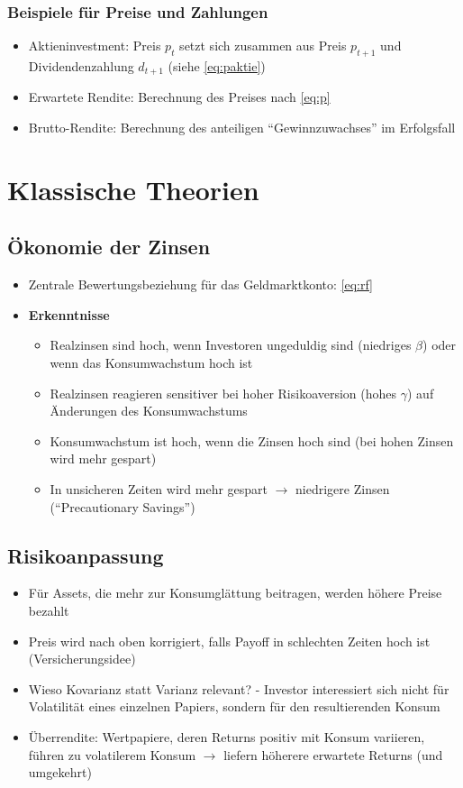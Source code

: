 \subsubsection{Beispiele für Preise und Zahlungen}
\begin{itemize}
	\item Aktieninvestment: Preis \(p_t\) setzt sich zusammen aus Preis \(p_{t+1}\) und Dividendenzahlung \(d_{t+1}\) (siehe \ref{eq:paktie})
	\item Erwartete Rendite: Berechnung des Preises nach \ref{eq:p}
	\item Brutto-Rendite: Berechnung des anteiligen "`Gewinnzuwachses"' im Erfolgsfall
\end{itemize}



\section{Klassische Theorien}

\subsection{Ökonomie der Zinsen}
\begin{itemize}
	\item Zentrale Bewertungsbeziehung für das Geldmarktkonto: \ref{eq:rf}
	\item \textbf{Erkenntnisse}
	\begin{itemize}
		\item Realzinsen sind hoch, wenn Investoren ungeduldig sind (niedriges \(\beta\)) oder wenn das Konsumwachstum hoch ist
		\item Realzinsen reagieren sensitiver bei hoher Risikoaversion (hohes \(\gamma\)) auf Änderungen des Konsumwachstums
		\item Konsumwachstum ist hoch, wenn die Zinsen hoch sind (bei hohen Zinsen wird mehr gespart)
		\item In unsicheren Zeiten wird mehr gespart \(\rightarrow\) niedrigere Zinsen ("`Precautionary Savings"')
	\end{itemize}
\end{itemize}


\subsection{Risikoanpassung}
\begin{itemize}
	\item Für Assets, die mehr zur Konsumglättung beitragen, werden höhere Preise bezahlt
	\item Preis wird nach oben korrigiert, falls Payoff in schlechten Zeiten hoch ist (Versicherungsidee)
	\item Wieso Kovarianz statt Varianz relevant? - Investor interessiert sich nicht für Volatilität eines einzelnen Papiers, sondern für den resultierenden Konsum
	\item Überrendite: Wertpapiere, deren Returns positiv mit Konsum variieren, führen zu volatilerem Konsum \(\rightarrow\) liefern höherere erwartete Returns (und umgekehrt)
\end{itemize}


